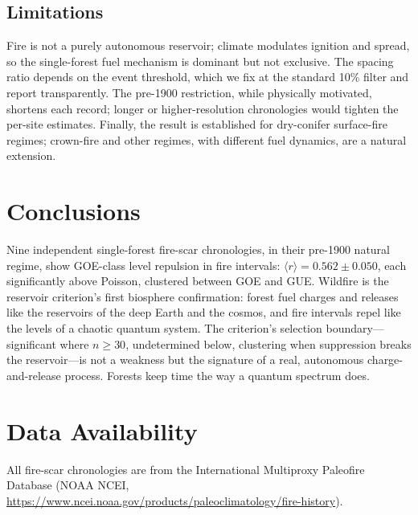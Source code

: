 \documentclass[12pt,a4paper]{article}
\begin{document}
\subsection{Limitations}
Fire is not a purely autonomous reservoir; climate modulates ignition and spread, so the single-forest fuel mechanism is dominant but not exclusive. The spacing ratio depends on the event threshold, which we fix at the standard 10\% filter and report transparently. The pre-1900 restriction, while physically motivated, shortens each record; longer or higher-resolution chronologies would tighten the per-site estimates. Finally, the result is established for dry-conifer surface-fire regimes; crown-fire and other regimes, with different fuel dynamics, are a natural extension.

\section{Conclusions}
Nine independent single-forest fire-scar chronologies, in their pre-1900 natural regime, show GOE-class level repulsion in fire intervals: $\langle r\rangle = 0.562 \pm 0.050$, each significantly above Poisson, clustered between GOE and GUE. Wildfire is the reservoir criterion's first biosphere confirmation: forest fuel charges and releases like the reservoirs of the deep Earth and the cosmos, and fire intervals repel like the levels of a chaotic quantum system. The criterion's selection boundary---significant where $n\ge30$, undetermined below, clustering when suppression breaks the reservoir---is not a weakness but the signature of a real, autonomous charge-and-release process. Forests keep time the way a quantum spectrum does.

\section*{Data Availability}
All fire-scar chronologies are from the International Multiproxy Paleofire Database (NOAA NCEI, \url{https://www.ncei.noaa.gov/products/paleoclimatology/fire-history}).
\end{document}
